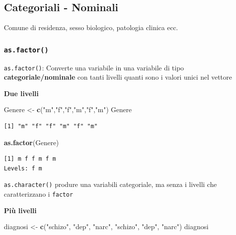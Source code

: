 \documentclass[
  a4paper,
  DIV=11,
  numbers=noendperiod]{scrreprt}
\newenvironment{Shaded}{\begin{snugshade}}{\end{snugshade}}
\newcommand{\FunctionTok}[1]{\textcolor[rgb]{0.13,0.29,0.53}{\textbf{#1}}}
\newcommand{\NormalTok}[1]{#1}
\newcommand{\OtherTok}[1]{\textcolor[rgb]{0.56,0.35,0.01}{#1}}
\newcommand{\StringTok}[1]{\textcolor[rgb]{0.31,0.60,0.02}{#1}}
\begin{document}
\subsection{Categoriali - Nominali}\label{categoriali---nominali}

Comune di residenza, sesso biologico, patologia clinica ecc.

\subsubsection{\texorpdfstring{\texttt{as.factor()}}{as.factor()}}\label{as.factor}

\texttt{as.factor()}: Converte una variabile in una variabile di tipo
\textbf{categoriale/nominale} con tanti livelli quanti sono i valori
unici nel vettore

\textbf{Due livelli}

\begin{Shaded}
\begin{Highlighting}[]
\NormalTok{Genere }\OtherTok{\textless{}{-}} \FunctionTok{c}\NormalTok{(}\StringTok{"m"}\NormalTok{,}\StringTok{"f"}\NormalTok{,}\StringTok{"f"}\NormalTok{,}\StringTok{"m"}\NormalTok{,}\StringTok{"f"}\NormalTok{,}\StringTok{"m"}\NormalTok{) }
\NormalTok{Genere}
\end{Highlighting}
\end{Shaded}

\begin{verbatim}
[1] "m" "f" "f" "m" "f" "m"
\end{verbatim}

\begin{Shaded}
\begin{Highlighting}[]
\FunctionTok{as.factor}\NormalTok{(Genere) }
\end{Highlighting}
\end{Shaded}

\begin{verbatim}
[1] m f f m f m
Levels: f m
\end{verbatim}

\texttt{as.character()} produre una variabili categoriale, ma senza i
livelli che caratterizzano i \texttt{factor}

\textbf{Più livelli}

\begin{Shaded}
\begin{Highlighting}[]
\NormalTok{diagnosi }\OtherTok{\textless{}{-}} \FunctionTok{c}\NormalTok{(}\StringTok{"schizo"}\NormalTok{, }\StringTok{"dep"}\NormalTok{, }\StringTok{"narc"}\NormalTok{, }\StringTok{"schizo"}\NormalTok{, }\StringTok{"dep"}\NormalTok{, }\StringTok{"narc"}\NormalTok{)}
\NormalTok{diagnosi}
\end{Highlighting}
\end{Shaded}
\end{document}
